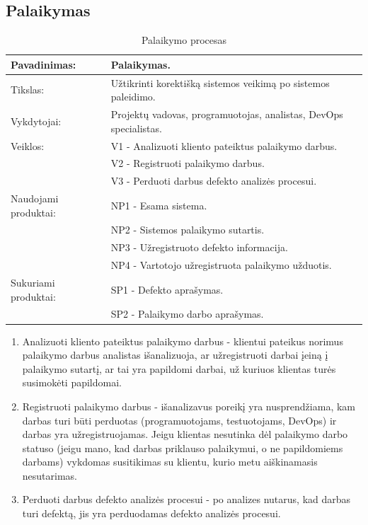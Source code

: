 \documentclass{VUMIFPSkursinis}
\begin{document}
	\subsection{Palaikymas}
	\begin{center}
		\begin{table}[ht]
		\caption{Palaikymo procesas}
		\begin{tabular}{ | l | l | } 
		\hline
		Pavadinimas:         & Palaikymas.                              \\ \hline
		Tikslas: 	           & Užtikrinti korektišką sistemos veikimą po sistemos paleidimo.\\ \hline
		Vykdytojai:          & Projektų vadovas, programuotojas, analistas, DevOps specialistas.                                \\ \hline
		Veiklos:             & V1 - Analizuoti kliento pateiktus palaikymo darbus.												\\ 
						             & V2 - Registruoti palaikymo darbus. \\ 
									  & V3 - Perduoti darbus defekto analizės procesui.																			 \\ 
									 \hline
		Naudojami produktai: & NP1 - Esama sistema. \\
						& NP2 - Sistemos palaikymo sutartis. \\
						& NP3 - Užregistruoto defekto informacija. \\
						& NP4 - Vartotojo užregistruota palaikymo užduotis. 																																										 \\ \hline
		Sukuriami produktai: & SP1 - Defekto aprašymas. \\
					       & SP2 - Palaikymo darbo aprašymas.																											\\ \hline
		\end{tabular}
	\end{table}
		\end{center}

		\begin{enumerate}
			\item{Analizuoti kliento pateiktus palaikymo darbus - klientui pateikus norimus palaikymo darbus analistas išanalizuoja, ar užregistruoti darbai įeiną į palaikymo sutartį, ar tai yra papildomi darbai, už kuriuos klientas turės susimokėti papildomai.}
			\item{Registruoti palaikymo darbus - išanalizavus poreikį yra nusprendžiama, kam darbas turi būti perduotas (programuotojams, testuotojams, DevOps) ir darbas yra užregistruojamas. Jeigu klientas nesutinka dėl palaikymo darbo statuso (jeigu mano, kad darbas priklauso palaikymui, o ne papildomiems darbams) vykdomas susitikimas su klientu, kurio metu aiškinamasis nesutarimas.}
			\item{Perduoti darbus defekto analizės procesui - po analizes nutarus, kad darbas turi defektą, jis yra perduodamas defekto analizės procesui.}
		\end{enumerate}
\end{document}
